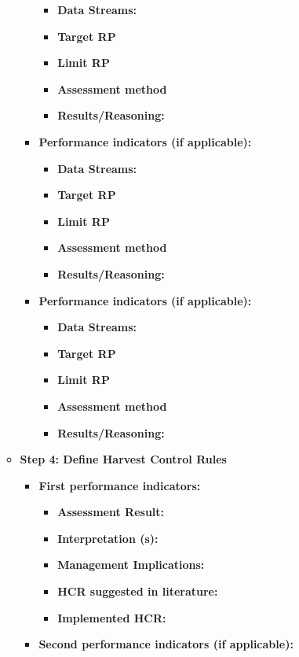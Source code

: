\documentclass[]{book}
\begin{document}
\begin{itemize}
\begin{itemize}
\begin{itemize}
      \begin{itemize}
      \item
        \textbf{Data Streams:}
      \item
        \textbf{Target RP}
      \item
        \textbf{Limit RP}
      \item
        \textbf{Assessment method}
      \item
        \textbf{Results/Reasoning:}
      \end{itemize}
    \item
      \textbf{Performance indicators (if applicable): }

      \begin{itemize}
      \item
        \textbf{Data Streams:}
      \item
        \textbf{Target RP}
      \item
        \textbf{Limit RP}
      \item
        \textbf{Assessment method}
      \item
        \textbf{Results/Reasoning:}
      \end{itemize}
    \item
      \textbf{Performance indicators (if applicable): }

      \begin{itemize}
      \item
        \textbf{Data Streams:}
      \item
        \textbf{Target RP}
      \item
        \textbf{Limit RP}
      \item
        \textbf{Assessment method}
      \item
        \textbf{Results/Reasoning:}
      \end{itemize}
    \end{itemize}
  \item
    \textbf{Step 4: Define Harvest Control Rules}

    \begin{itemize}
    \item
      \textbf{First performance indicators: }

      \begin{itemize}
      \item
        \textbf{Assessment Result:}
      \item
        \textbf{Interpretation (s):}
      \item
        \textbf{Management Implications:}
      \item
        \textbf{HCR suggested in literature:}
      \item
        \textbf{Implemented HCR:}
      \end{itemize}
    \item
      \textbf{Second performance indicators (if applicable): }


\end{itemize}
\end{itemize}
\end{itemize}
\end{document}
